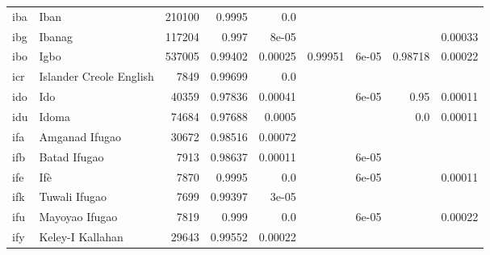 \documentclass[11pt]{article}
\begin{document}
\begin{table*}[h]
{\begin{tabular}{llrrrrrrr}
iba         & Iban         & 210100         & 0.9995         & 0.0         &          &          &          &          \\

ibg         & Ibanag         & 117204         & 0.997         & 8e-05         &          &          &          & 0.00033         \\

ibo         & Igbo         & 537005         & 0.99402         & 0.00025         & 0.99951         & 6e-05         & 0.98718         & 0.00022         \\

icr         & Islander Creole English         & 7849         & 0.99699         & 0.0         &          &          &          &          \\

ido         & Ido         & 40359         & 0.97836         & 0.00041         &          & 6e-05         & 0.95         & 0.00011         \\

idu         & Idoma         & 74684         & 0.97688         & 0.0005         &          &          & 0.0         & 0.00011         \\

ifa         & Amganad Ifugao         & 30672         & 0.98516         & 0.00072         &          &          &          &          \\

ifb         & Batad Ifugao         & 7913         & 0.98637         & 0.00011         &          & 6e-05         &          &          \\

ife         & Ifè         & 7870         & 0.9995         & 0.0         &          & 6e-05         &          & 0.00011         \\

ifk         & Tuwali Ifugao         & 7699         & 0.99397         & 3e-05         &          &          &          &          \\

ifu         & Mayoyao Ifugao         & 7819         & 0.999         & 0.0         &          & 6e-05         &          & 0.00022         \\

ify         & Keley-I Kallahan         & 29643         & 0.99552         & 0.00022         &          &          &          &          \\


\end{tabular}}
\end{table*}
\end{document}
